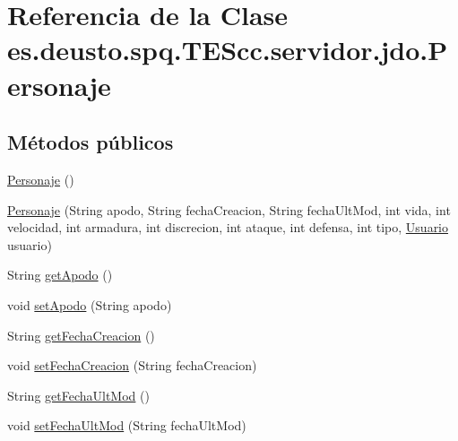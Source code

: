 \hypertarget{classes_1_1deusto_1_1spq_1_1_t_e_scc_1_1servidor_1_1jdo_1_1_personaje}{\section{Referencia de la Clase es.\+deusto.\+spq.\+T\+E\+Scc.\+servidor.\+jdo.\+Personaje}
\label{classes_1_1deusto_1_1spq_1_1_t_e_scc_1_1servidor_1_1jdo_1_1_personaje}
}
\subsection*{Métodos públicos}
\begin{DoxyCompactItemize}
\item 
\hyperlink{classes_1_1deusto_1_1spq_1_1_t_e_scc_1_1servidor_1_1jdo_1_1_personaje_a6bf0119d54a5f8d31163181488553205}{Personaje} ()
\item 
\hyperlink{classes_1_1deusto_1_1spq_1_1_t_e_scc_1_1servidor_1_1jdo_1_1_personaje_a490db1285c96fb5055e205ff027725a6}{Personaje} (String apodo, String fecha\+Creacion, String fecha\+Ult\+Mod, int vida, int velocidad, int armadura, int discrecion, int ataque, int defensa, int tipo, \hyperlink{classes_1_1deusto_1_1spq_1_1_t_e_scc_1_1servidor_1_1jdo_1_1_usuario}{Usuario} usuario)
\item 
String \hyperlink{classes_1_1deusto_1_1spq_1_1_t_e_scc_1_1servidor_1_1jdo_1_1_personaje_a864ba2d4be518e7e4717bac88bc68bcf}{get\+Apodo} ()
\item 
void \hyperlink{classes_1_1deusto_1_1spq_1_1_t_e_scc_1_1servidor_1_1jdo_1_1_personaje_a20e171d4b3c2e0f671f15bc642ffdb6c}{set\+Apodo} (String apodo)
\item 
String \hyperlink{classes_1_1deusto_1_1spq_1_1_t_e_scc_1_1servidor_1_1jdo_1_1_personaje_a72f02c38f2512e9dc59de2248b0bc596}{get\+Fecha\+Creacion} ()
\item 
void \hyperlink{classes_1_1deusto_1_1spq_1_1_t_e_scc_1_1servidor_1_1jdo_1_1_personaje_a6cf30f43efb069a932ad19b56e959f21}{set\+Fecha\+Creacion} (String fecha\+Creacion)
\item 
String \hyperlink{classes_1_1deusto_1_1spq_1_1_t_e_scc_1_1servidor_1_1jdo_1_1_personaje_a2d995c9dbb174801cf92096534234184}{get\+Fecha\+Ult\+Mod} ()
\item 
void \hyperlink{classes_1_1deusto_1_1spq_1_1_t_e_scc_1_1servidor_1_1jdo_1_1_personaje_a1a0da8f4efb99fa251d4aa72a4b33643}{set\+Fecha\+Ult\+Mod} (String fecha\+Ult\+Mod)

\end{DoxyCompactItemize}
